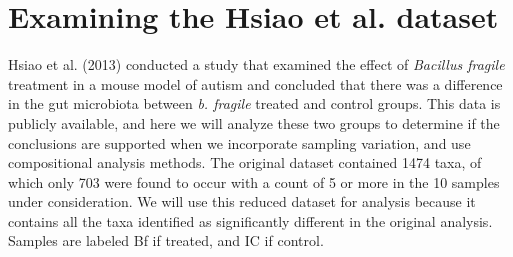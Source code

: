 \documentclass[11pt]{article}\usepackage[]{graphicx}\usepackage[]{color}
\begin{document}
\section{Examining the Hsiao et al. dataset}

Hsiao et al. (2013)\cite{Hsiao:2013} conducted a study that examined the effect of \emph{Bacillus fragile} treatment in a mouse model of autism and concluded that there was a difference in the gut microbiota between \emph{b. fragile} treated and control groups. This data is publicly available, and here we will analyze these two groups to determine if the conclusions are supported when we incorporate sampling variation, and use compositional analysis methods. The original dataset contained 1474 taxa, of which only 703 were found to occur with a count of 5 or more in the 10 samples under consideration. We will use this reduced dataset for analysis because it contains all the taxa identified as significantly different in the original analysis. Samples are labeled Bf if treated, and IC if control.
\end{document}
